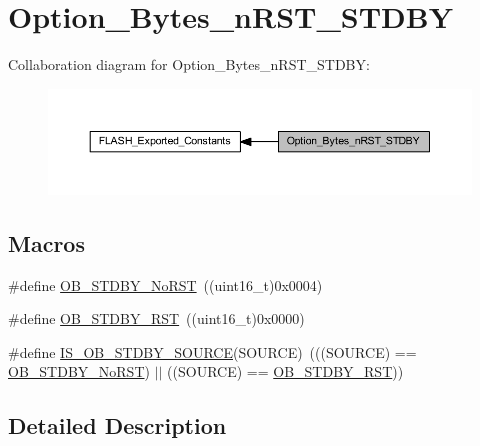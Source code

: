 \hypertarget{group___option___bytes__n_r_s_t___s_t_d_b_y}{}\section{Option\+\_\+\+Bytes\+\_\+n\+R\+S\+T\+\_\+\+S\+T\+D\+BY}
\label{group___option___bytes__n_r_s_t___s_t_d_b_y}
Collaboration diagram for Option\+\_\+\+Bytes\+\_\+n\+R\+S\+T\+\_\+\+S\+T\+D\+BY\+:
\nopagebreak
\begin{figure}[H]
\begin{center}
\leavevmode
\includegraphics[width=350pt]{group___option___bytes__n_r_s_t___s_t_d_b_y}
\end{center}
\end{figure}
\subsection*{Macros}
\begin{DoxyCompactItemize}
\item 
\#define \hyperlink{group___option___bytes__n_r_s_t___s_t_d_b_y_ga9588443b20719498422aeb72b65de839}{O\+B\+\_\+\+S\+T\+D\+B\+Y\+\_\+\+No\+R\+ST}~((uint16\+\_\+t)0x0004)
\item 
\#define \hyperlink{group___option___bytes__n_r_s_t___s_t_d_b_y_ga69451a6f69247528f58735c9c83499ce}{O\+B\+\_\+\+S\+T\+D\+B\+Y\+\_\+\+R\+ST}~((uint16\+\_\+t)0x0000)
\item 
\#define \hyperlink{group___option___bytes__n_r_s_t___s_t_d_b_y_ga8a05393df3a5e89551b4e2e1e8c5b884}{I\+S\+\_\+\+O\+B\+\_\+\+S\+T\+D\+B\+Y\+\_\+\+S\+O\+U\+R\+CE}(S\+O\+U\+R\+CE)~(((S\+O\+U\+R\+CE) == \hyperlink{group___option___bytes__n_r_s_t___s_t_d_b_y_ga9588443b20719498422aeb72b65de839}{O\+B\+\_\+\+S\+T\+D\+B\+Y\+\_\+\+No\+R\+ST}) $\vert$$\vert$ ((S\+O\+U\+R\+CE) == \hyperlink{group___option___bytes__n_r_s_t___s_t_d_b_y_ga69451a6f69247528f58735c9c83499ce}{O\+B\+\_\+\+S\+T\+D\+B\+Y\+\_\+\+R\+ST}))
\end{DoxyCompactItemize}


\subsection{Detailed Description}


